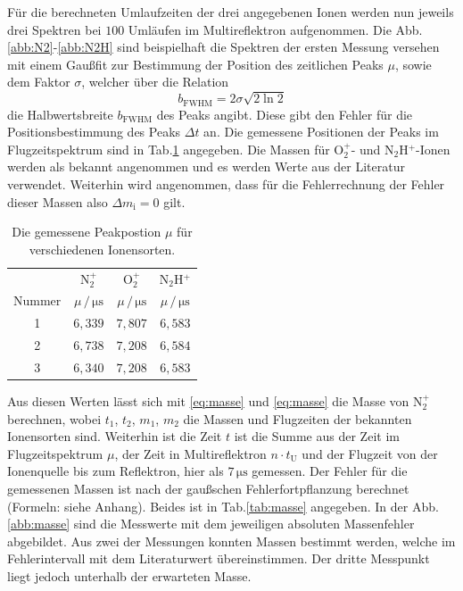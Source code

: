 \documentclass[numbers=noenddot,a4paper,notitlepage,twoside,BCOR15mm]{scrartcl}
\begin{document}
		Für die berechneten Umlaufzeiten der drei angegebenen Ionen werden nun jeweils drei Spektren bei $100$ Umläufen im Multireflektron aufgenommen. Die Abb.\ref{abb:N2}-\ref{abb:N2H} sind beispielhaft die Spektren der ersten Messung versehen mit einem Gaußfit zur Bestimmung der Position des zeitlichen Peaks $\mu$, sowie dem Faktor $\sigma$, welcher über die Relation
		\begin{equation}
			b_\mathrm{FWHM} = 2 \sigma\sqrt{2 \ln 2}
		\end{equation}
		die Halbwertsbreite $b_\mathrm{FWHM}$ des Peaks angibt. Diese gibt den Fehler für die Positionsbestimmung des Peaks $\Delta t$ an. Die gemessene Positionen der Peaks im Flugzeitspektrum sind in Tab.\ref{tab:zeit} angegeben. Die Massen für O${}_2^+$- und N${}_2$H$^+$-Ionen werden als bekannt angenommen und es werden Werte aus der Literatur verwendet. Weiterhin wird angenommen, dass für die Fehlerrechnung der Fehler dieser Massen also $\Delta m_\mathrm{i} = 0$ gilt.
		\begin{table}[t]
			\centering
			\caption{Die gemessene Peakpostion $\mu$ für verschiedenen Ionensorten.}
			\begin{tabular}{c|c c c} 
				 & N$_2^+$ & O$_2^+$ & N$_2$H$^+$ \\
				 Nummer & $\mu\,/\,\mathrm{\mu s}$ & $\mu\,/\,\mathrm{\mu s}$ & $\mu\,/\,\mathrm{\mu s}$ \\ \hline
				 1 & $6,339$ & $7,807$ & $6,583$ \\
				 2 & $6,738$ & $7,208$ & $6,584$ \\
				 3 & $6,340$ & $7,208$ & $6,583$ 
			\end{tabular}
			\label{tab:zeit}
		\end{table}
		Aus diesen Werten lässt sich mit \eqref{eq:masse} und \eqref{eq:masse} die Masse von N$_2^+$ berechnen, wobei $t_1$, $t_2$, $m_1$, $m_2$ die Massen und Flugzeiten der bekannten Ionensorten sind. Weiterhin ist die Zeit $t$ ist die Summe aus der Zeit im Flugzeitspektrum $\mu$, der Zeit in Multireflektron $n\cdot t_\mathrm{U}$ und der Flugzeit von der Ionenquelle bis zum Reflektron, hier als $7\,\mathrm{\mu s}$ gemessen. Der Fehler für die gemessenen Massen ist nach der gaußschen Fehlerfortpflanzung berechnet (Formeln: siehe Anhang). Beides ist in Tab.\ref{tab:masse} angegeben. In der Abb.\ref{abb:masse} sind die Messwerte mit dem jeweiligen absoluten Massenfehler abgebildet. Aus zwei der Messungen konnten Massen bestimmt werden, welche im Fehlerintervall mit dem Literaturwert übereinstimmen. Der dritte Messpunkt liegt jedoch unterhalb der erwarteten Masse.
\end{document}
